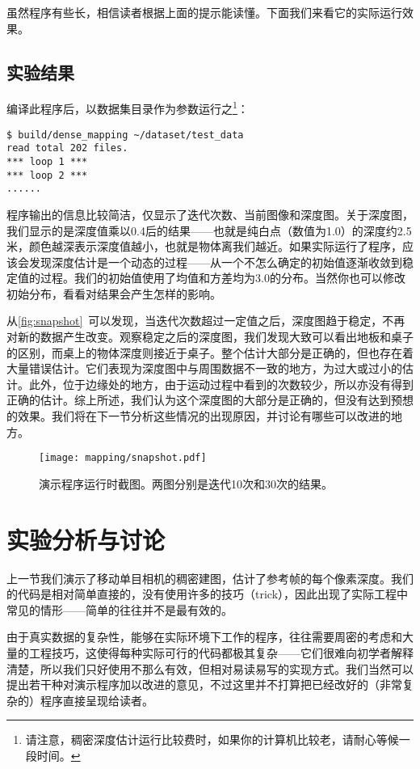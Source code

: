 虽然程序有些长，相信读者根据上面的提示能读懂。下面我们来看它的实际运行效果。

\subsection*{实验结果}
编译此程序后，以数据集目录作为参数运行之\footnote{请注意，稠密深度估计运行比较费时，如果你的计算机比较老，请耐心等候一段时间。}：
\begin{lstlisting}
$ build/dense_mapping ~/dataset/test_data 
read total 202 files.
*** loop 1 ***
*** loop 2 ***
......
\end{lstlisting}

\clearpage
程序输出的信息比较简洁，仅显示了迭代次数、当前图像和深度图。关于深度图，我们显示的是深度值乘以0.4后的结果——也就是纯白点（数值为1.0）的深度约2.5米，颜色越深表示深度值越小，也就是物体离我们越近。如果实际运行了程序，应该会发现深度估计是一个动态的过程——从一个不怎么确定的初始值逐渐收敛到稳定值的过程。我们的初始值使用了均值和方差均为3.0的分布。当然你也可以修改初始分布，看看对结果会产生怎样的影响。

从\autoref{fig:snapshot}~可以发现，当迭代次数超过一定值之后，深度图趋于稳定，不再对新的数据产生改变。观察稳定之后的深度图，我们发现大致可以看出地板和桌子的区别，而桌上的物体深度则接近于桌子。整个估计大部分是正确的，但也存在着大量错误估计。它们表现为深度图中与周围数据不一致的地方，为过大或过小的估计。此外，位于边缘处的地方，由于运动过程中看到的次数较少，所以亦没有得到正确的估计。综上所述，我们认为这个深度图的大部分是正确的，但没有达到预想的效果。我们将在下一节分析这些情况的出现原因，并讨论有哪些可以改进的地方。

\begin{figure}[!ht]
	\centering
	\texttt{[image: mapping/snapshot.pdf]}
	\caption{演示程序运行时截图。两图分别是迭代10次和30次的结果。}
	\label{fig:snapshot}
\end{figure}

\clearpage
\section{实验分析与讨论}
上一节我们演示了移动单目相机的稠密建图，估计了参考帧的每个像素深度。我们的代码是相对简单直接的，没有使用许多的技巧（trick），因此出现了实际工程中常见的情形——简单的往往并不是最有效的。

由于真实数据的复杂性，能够在实际环境下工作的程序，往往需要周密的考虑和大量的工程技巧，这使得每种实际可行的代码都极其复杂——它们很难向初学者解释清楚，所以我们只好使用不那么有效，但相对易读易写的实现方式。我们当然可以提出若干种对演示程序加以改进的意见，不过这里并不打算把已经改好的（非常复杂的）程序直接呈现给读者。

